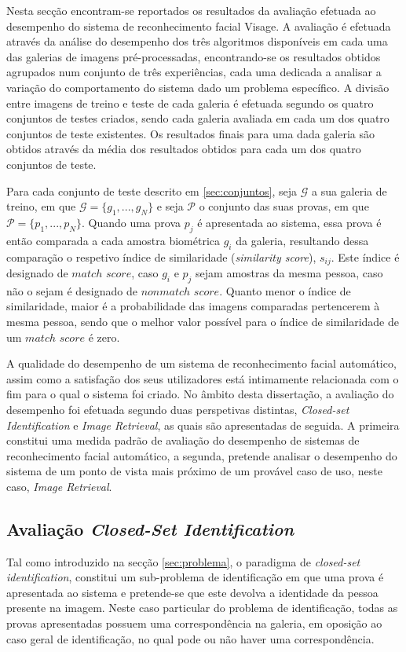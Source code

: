 Nesta secção encontram-se reportados os resultados da avaliação efetuada ao desempenho do sistema de reconhecimento facial Visage. A avaliação é efetuada através da análise do desempenho dos três algoritmos disponíveis em cada uma das galerias de imagens pré-processadas, encontrando-se os resultados obtidos agrupados num conjunto de três experiências, cada uma dedicada a analisar a variação do comportamento do sistema dado um problema específico. A divisão entre imagens de treino e teste de cada galeria é efetuada segundo os quatro conjuntos de testes criados, sendo cada galeria avaliada em cada um dos quatro conjuntos de teste existentes. Os resultados finais para uma dada galeria são obtidos através da média dos resultados obtidos para cada um dos quatro conjuntos de teste.

Para cada conjunto de teste descrito em \ref{sec:conjuntos}, seja $\mathscr{G}$ a sua galeria de treino, em que $\mathscr{G} = \{g_1, ..., g_N\}$ e seja $\mathscr{P}$ o conjunto das suas provas, em que $\mathscr{P} = \{p_1, ..., p_N\}$. Quando uma prova $p_j$ é apresentada ao sistema, essa prova é então comparada a cada amostra biométrica $g_i$ da galeria, resultando dessa comparação o respetivo índice de similaridade (\textit{similarity score}), $s_{ij}$. Este índice é designado de $match$ $score$, caso $g_i$ e $p_j$ sejam amostras da mesma pessoa, caso não o sejam é designado de $nonmatch$ $score$. Quanto menor o índice de similaridade, maior é a probabilidade das imagens comparadas pertencerem à mesma pessoa, sendo que o melhor valor possível para o índice de similaridade de um $match$ $score$ é zero.

A qualidade do desempenho de um sistema de reconhecimento facial automático, assim como a satisfação dos seus utilizadores está intimamente relacionada com o fim para o qual o sistema foi criado. No âmbito desta dissertação, a avaliação do desempenho foi efetuada segundo duas perspetivas distintas, \textit{Closed-set Identification} e \textit{Image Retrieval}, as quais são apresentadas de seguida. A primeira constitui uma medida padrão de avaliação do desempenho de sistemas de reconhecimento facial automático, a segunda, pretende analisar o desempenho do sistema de um ponto de vista mais próximo de um provável caso de uso, neste caso, \textit{Image Retrieval}.

\subsection{Avaliação \textit{Closed-Set Identification}} \label{sec:avaliacao1}
Tal como introduzido na secção \ref{sec:problema}, o paradigma de \textit{closed-set identification}, constitui um sub-problema de identificação em que uma prova é apresentada ao sistema e pretende-se que este devolva a identidade da pessoa presente na imagem. Neste caso particular do problema de identificação, todas as provas apresentadas possuem uma correspondência na galeria, em oposição ao caso geral de identificação, no qual pode ou não haver uma correspondência.

